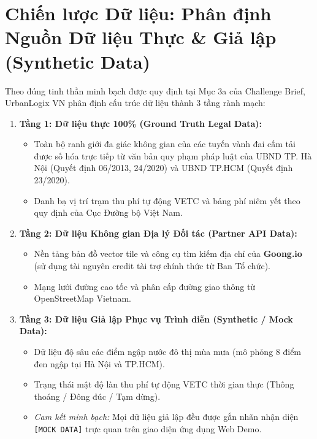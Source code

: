 \documentclass[11pt,a4paper]{article}
\begin{document}
\section{Chiến lược Dữ liệu: Phân định Nguồn Dữ liệu Thực \& Giả lập (Synthetic Data)}

Theo đúng tinh thần minh bạch được quy định tại Mục 3a của Challenge Brief, UrbanLogix VN phân định cấu trúc dữ liệu thành 3 tầng rành mạch:

\begin{enumerate}
  \item \textbf{Tầng 1: Dữ liệu thực 100\% (Ground Truth Legal Data):}
  \begin{itemize}
    \item Toàn bộ ranh giới đa giác không gian của các tuyến vành đai cấm tải được số hóa trực tiếp từ văn bản quy phạm pháp luật của UBND TP. Hà Nội (Quyết định 06/2013, 24/2020) và UBND TP.HCM (Quyết định 23/2020).
    \item Danh bạ vị trí trạm thu phí tự động VETC và bảng phí niêm yết theo quy định của Cục Đường bộ Việt Nam.
  \end{itemize}
  \item \textbf{Tầng 2: Dữ liệu Không gian Địa lý Đối tác (Partner API Data):}
  \begin{itemize}
    \item Nền tảng bản đồ vector tile và công cụ tìm kiếm địa chỉ của \textbf{Goong.io} (sử dụng tài nguyên credit tài trợ chính thức từ Ban Tổ chức).
    \item Mạng lưới đường cao tốc và phân cấp đường giao thông từ OpenStreetMap Vietnam.
  \end{itemize}
  \item \textbf{Tầng 3: Dữ liệu Giả lập Phục vụ Trình diễn (Synthetic / Mock Data):}
  \begin{itemize}
    \item Dữ liệu độ sâu các điểm ngập nước đô thị mùa mưa (mô phỏng 8 điểm đen ngập tại Hà Nội và TP.HCM).
    \item Trạng thái mật độ làn thu phí tự động VETC thời gian thực (Thông thoáng / Đông đúc / Tạm dừng).
    \item \textit{Cam kết minh bạch:} Mọi dữ liệu giả lập đều được gắn nhãn nhận diện \texttt{[MOCK DATA]} trực quan trên giao diện ứng dụng Web Demo.
  \end{itemize}
\end{enumerate}
\end{document}
